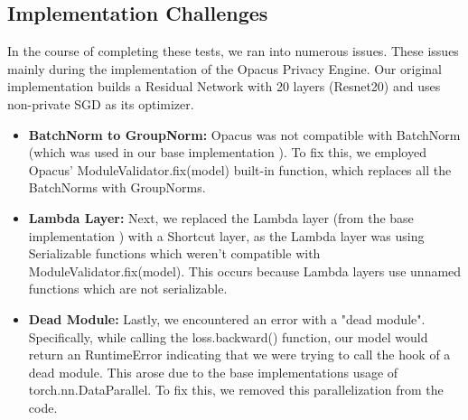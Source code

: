 \subsection{Implementation Challenges}\label{subsec:implementation-challenges}
In the course of completing these tests, we ran into numerous issues. These issues mainly during the implementation of the Opacus Privacy Engine. Our original implementation builds a Residual Network
with 20 layers (Resnet20) and uses non-private SGD as its optimizer.
\begin{itemize}
    \item \textbf{BatchNorm to GroupNorm:} Opacus was not compatible with BatchNorm (which was used in our base implementation \cite{Idelbayev_ResNet20}). To fix this, we employed Opacus' ModuleValidator.fix(model) built-in function, which replaces all the BatchNorms with GroupNorms.
    \item \textbf{Lambda Layer:} Next, we replaced the Lambda layer (from the base implementation \cite{Idelbayev_ResNet20}) with a Shortcut layer, as the Lambda layer was using Serializable functions which weren't compatible with ModuleValidator.fix(model). This occurs because Lambda layers use unnamed functions which are not serializable.
    \item \textbf{Dead Module:} Lastly, we encountered an error with a "dead module". Specifically, while calling the loss.backward() function, our model would return an RuntimeError indicating that we were trying to call the hook of a dead module. This arose due to the base implementations \cite{Idelbayev_ResNet20} usage of torch.nn.DataParallel. To fix this, we removed this parallelization from the code.

\end{itemize}

